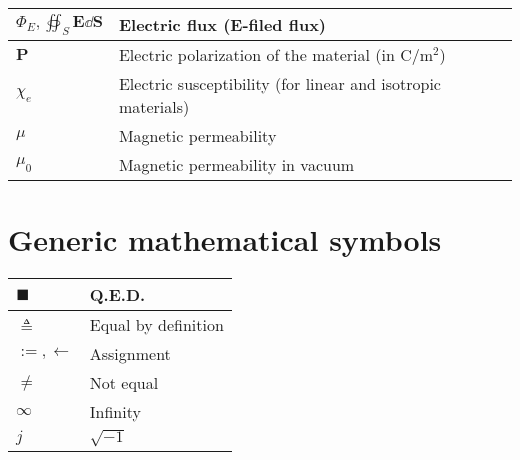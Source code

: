 \documentclass{article}
\begin{document}
\begin{xltabular}{\textwidth}{XX}
	\(\Phi_E, \oiint_S \mathbf{E} \dd{\mathbf{S}}\)              & Electric flux (\(\mathbf{E}\)-filed flux) \cite{wiki:electric-flux}                                                                                                                      \\ \hline
	\(\mathbf{P}\)                                               & Electric polarization of the material (in \(\si{\coulomb\per\meter\squared}\))                                                                                                           \\ \hline
	\(\chi_e\)                                                   & Electric susceptibility (for linear and isotropic materials)                                                                                                                             \\ \hline
	\(\mu\)                                                      & Magnetic permeability                                                                                                                                                                    \\ \hline
	\(\mu_0\)                                                    & Magnetic permeability in vacuum                                                                                                                                                          \\
\end{xltabular}

\section{Generic mathematical symbols}
\begin{xltabular}{\textwidth}{XX}
	\(\blacksquare\)   & Q.E.D.                                            \\ \hline
	\(\triangleq\)     & Equal by definition                               \\ \hline
	\(:=, \leftarrow\) & Assignment \cite{rosenDiscreteMathematicsIts2011} \\ \hline
	\(\neq\)           & Not equal                                         \\ \hline
	\(\infty\)         & Infinity                                          \\ \hline
	\(j\)              & \(\sqrt{-1}\)                                     \\
\end{xltabular}
\end{document}
